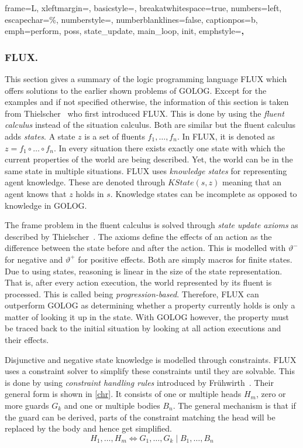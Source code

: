  {
  frame=L,
  xleftmargin=\parindent,
  basicstyle=\footnotesize\ttfamily,
  breakatwhitespace=true,
  numbers=left,
  escapechar=\%,
  numberstyle=\tiny,
  numberblanklines=false,
  captionpos=b,
  emph={perform, poss, state\_update, main\_loop, init},
  emphstyle=\textbf,
}
%
\lstset{style=flux} %
\subsubsection{FLUX.}\label{fun:apl_flux}
This section gives a summary of the logic programming language FLUX which offers solutions to the earlier shown problems of GOLOG. Except for the examples and if not specified otherwise, the information of this section is taken from Thielscher~\cite{thielscher_flux:_2005} who first introduced FLUX. This is done by using the \emph{fluent calculus} instead of the situation calculus. Both are similar but the fluent calculus adds \emph{states}. A state $z$ is a set of fluents $f_1,\dotsc,f_n$. In FLUX, it is denoted as $z = f_1 \circ\dotsc\circ f_n$. In every situation there exists exactly one state with which the current properties of the world are being described. Yet, the world can be in the same state in multiple situations. FLUX uses \emph{knowledge states} for representing agent knowledge. These are denoted through $\textit{KState}(s,z)$ meaning that an agent knows that $z$ holds in $s$. Knowledge states can be incomplete as opposed to knowledge in GOLOG.

The frame problem in the fluent calculus is solved through \emph{state update axioms} as described by Thielscher~\cite{thielscher_situation_1999}. The axioms define the effects of an action as the difference between the state before and after the action. This is modelled with $\vartheta^-$ for negative and $\vartheta^+$ for positive effects. Both are simply macros for finite states. Due to using states, reasoning is linear in the size of the state representation. That is, after every action execution, the world represented by its fluent is processed. This is called being \emph{progression-based}. Therefore, FLUX can outperform GOLOG as determining whether a property currently holds is only a matter of looking it up in the state. With GOLOG however, the property must be traced back to the initial situation by looking at all action executions and their effects.

Disjunctive and negative state knowledge is modelled through constraints. FLUX uses a constraint solver to simplify these constraints until they are solvable. This is done by using \emph{constraint handling rules} introduced by Frühwirth~\cite{fruhwirth_theory_1998}. Their general form is shown in \autoref{chr}. It consists of one or multiple heads $H_m$, zero or more guards $G_k$ and one or multiple bodies $B_n$. The general mechanism is that if the guard can be derived, parts of the constraint matching the head will be replaced by the body and hence get simplified.
\begin{equation}\label{chr}
  H_1,\ldots,H_m\Leftrightarrow G_1,\ldots,G_k \mid B_1,\ldots,B_n
\end{equation}

